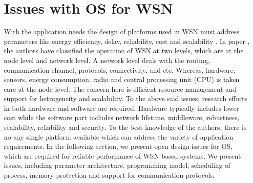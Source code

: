 \documentclass[12pt,journal,communications surveys and tutorials]{IEEEtran}
\begin{document}
\section{Issues with OS for WSN }
With the application needs the design of platforms used in WSN must address parameters like energy efficiency, delay, reliability, cost and scalability \cite{dutta2012operating}. In paper \cite{hui2004dynamic}, the authors have classified the operation of WSN at two levels, which are at the node level and network level. A network level deals with the routing, communication channel, protocols, connectivity, and etc. Whereas, hardware, sensors, energy consumption, radio and central processing unit (CPU) is taken care at the node level. The concern here is efficient resource management and support for hetrogeneity and scalability. To the above said issues, research efforts in both hardware and software are required. Hardware typically includes lower cost while the software part includes network lifetime, middleware, robustness, scalability, reliability and security. To the best knowledge of the authors, there is no any single platform available which can address the variety of application requirements. In the following section, we present open design issues for OS, which are required for reliable performance of WSN based systems. We present issues, including parameter architecture, programming model, scheduling of process, memory protection and support for communication protocols.
\end{document}
